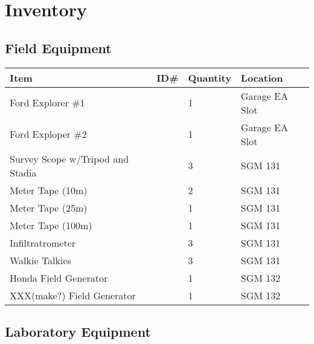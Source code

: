 \documentclass[12pt]{../SOP4_alpha}\usepackage[]{graphicx}\usepackage[]{color}
\begin{document}


\section{Inventory}

\subsection{Field Equipment}

\begin{tabular}{|l|l|l|l|}
\hline
Item      & ID\#  & Quantity & Location \\ \hline
Ford Explorer \#1 && 1 & Garage EA Slot \\
Ford Exploper \#2  && 1 & Garage EA Slot \\
Survey Scope w/Tripod and Stadia  && 3 & SGM 131 \\
Meter Tape (10m)  && 2 & SGM 131 \\
Meter Tape (25m)  && 1 & SGM 131 \\
Meter Tape (100m) && 1 & SGM 131 \\
Infiltratrometer  && 3 & SGM 131 \\
Walkie Talkies && 3 & SGM 131 \\
Honda Field Generator  && 1 & SGM 132 \\
XXX(make?) Field Generator && 1 & SGM 132 \\
\hline
\end{tabular}

\subsection{Laboratory Equipment}
\end{document}
